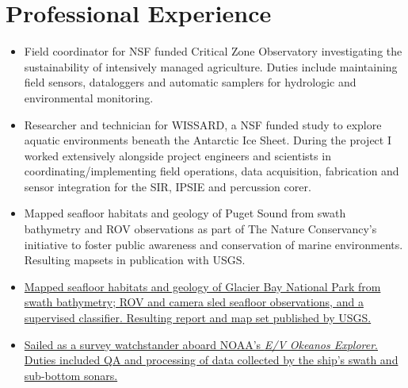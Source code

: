 \section{Professional Experience}

\begin{itemize}
\item Field coordinator for NSF funded Critical Zone Observatory investigating the sustainability of intensively managed agriculture. 
  Duties include maintaining field sensors, dataloggers and automatic samplers for hydrologic and environmental monitoring.
\end{itemize}

\begin{itemize}
\item Researcher and technician for WISSARD, a NSF funded study to explore aquatic environments beneath the Antarctic Ice
  Sheet. During the project I worked extensively alongside project engineers and scientists in coordinating/implementing field operations, data acquisition, fabrication and sensor integration for the SIR, IPSIE and percussion corer. 
\item Mapped seafloor habitats and geology of Puget Sound from swath bathymetry and ROV observations as part of The Nature
  Conservancy's initiative to foster public awareness and conservation of marine
  environments. Resulting mapsets in publication with USGS.

\item \href{http://pubs.usgs.gov/sim/3253/}{Mapped seafloor habitats and geology
  of Glacier Bay National Park from swath bathymetry; ROV and camera sled seafloor observations, and a supervised classifier. Resulting report and map set published by USGS.}
  
\end{itemize}

\begin{itemize}
\item \href{http://www.niutoday.info/2014/04/17/niu-student-lands-coveted-internship-aboard-exploration-ship/}
  {Sailed as a survey watchstander aboard NOAA's \textit{E/V Okeanos Explorer}.
  Duties included QA and processing of data collected by the ship's swath and sub-bottom sonars.}
\end{itemize}


